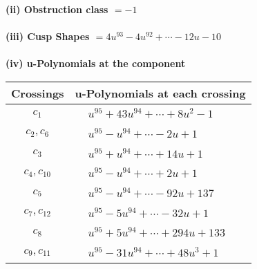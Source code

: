 \documentclass[1p]{elsarticle_modified}
\theoremstyle{definition}
\begin{document}
\flushleft \textbf{(ii) Obstruction class $= -1$}\\~\\
\flushleft \textbf{(iii) Cusp Shapes $= 4 u^{93}-4 u^{92}+\cdots-12 u-10$}\\~\\
\newpage\renewcommand{\arraystretch}{1}
\flushleft \textbf{(iv) u-Polynomials at the component}\newline \\
\begin{tabular}{m{50pt}|m{274pt}}
Crossings & \hspace{64pt}u-Polynomials at each crossing \\
\hline $$\begin{aligned}c_{1}\end{aligned}$$&$\begin{aligned}
&u^{95}+43 u^{94}+\cdots+8 u^2-1
\end{aligned}$\\
\hline $$\begin{aligned}c_{2},c_{6}\end{aligned}$$&$\begin{aligned}
&u^{95}- u^{94}+\cdots-2 u+1
\end{aligned}$\\
\hline $$\begin{aligned}c_{3}\end{aligned}$$&$\begin{aligned}
&u^{95}+u^{94}+\cdots+14 u+1
\end{aligned}$\\
\hline $$\begin{aligned}c_{4},c_{10}\end{aligned}$$&$\begin{aligned}
&u^{95}- u^{94}+\cdots+2 u+1
\end{aligned}$\\
\hline $$\begin{aligned}c_{5}\end{aligned}$$&$\begin{aligned}
&u^{95}- u^{94}+\cdots-92 u+137
\end{aligned}$\\
\hline $$\begin{aligned}c_{7},c_{12}\end{aligned}$$&$\begin{aligned}
&u^{95}-5 u^{94}+\cdots-32 u+1
\end{aligned}$\\
\hline $$\begin{aligned}c_{8}\end{aligned}$$&$\begin{aligned}
&u^{95}+5 u^{94}+\cdots+294 u+133
\end{aligned}$\\
\hline $$\begin{aligned}c_{9},c_{11}\end{aligned}$$&$\begin{aligned}
&u^{95}-31 u^{94}+\cdots+48 u^3+1
\end{aligned}$\\
\hline
\end{tabular}\\~\\
\end{document}
